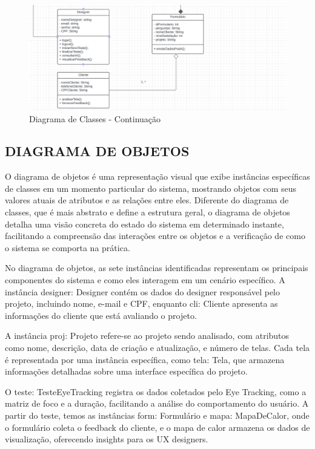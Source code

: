 \vspace{12pt}

\begin{figure}[H]
    \centering
    \caption{Diagrama de Classes - Continuação}%
    \label{fig:pg-classes2}
    \includegraphics[width=0.72\linewidth]{Illustrations/classes2.png}
\end{figure}

\subsection*{DIAGRAMA DE OBJETOS}
O diagrama de objetos é uma representação visual que exibe instâncias específicas de classes em um momento particular do sistema, mostrando objetos com seus valores atuais de atributos e as relações entre eles. Diferente do diagrama de classes, que é mais abstrato e define a estrutura geral, o diagrama de objetos detalha uma visão concreta do estado do sistema em determinado instante, facilitando a compreensão das interações entre os objetos e a verificação de como o sistema se comporta na prática.

No diagrama de objetos, as sete instâncias identificadas representam os principais componentes do sistema e como eles interagem em um cenário específico. A instância designer: Designer contém os dados do designer responsável pelo projeto, incluindo nome, e-mail e CPF, enquanto cli: Cliente apresenta as informações do cliente que está avaliando o projeto.

A instância proj: Projeto refere-se ao projeto sendo analisado, com atributos como nome, descrição, data de criação e atualização, e número de telas. Cada tela é representada por uma instância específica, como tela: Tela, que armazena informações detalhadas sobre uma interface específica do projeto.

O teste: TesteEyeTracking registra os dados coletados pelo Eye Tracking, como a matriz de foco e a duração, facilitando a análise do comportamento do usuário. A partir do teste, temos as instâncias form: Formulário e mapa: MapaDeCalor, onde o formulário coleta o feedback do cliente, e o mapa de calor armazena os dados de visualização, oferecendo insights para os UX designers.\newline

